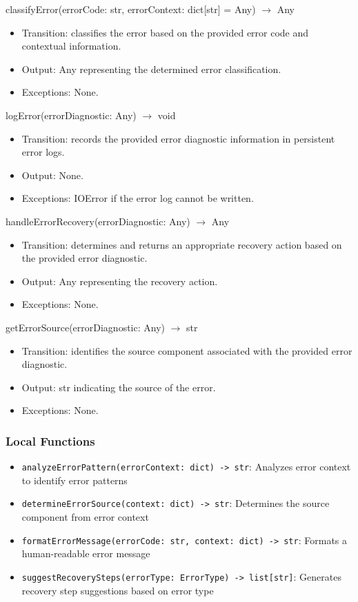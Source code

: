 \documentclass[12pt, titlepage]{article}
\begin{document}
classifyError(errorCode: str, errorContext: dict[str] = Any) $\rightarrow$ Any
\begin{itemize}
  \item Transition: classifies the error based on the provided error code and contextual information.
  \item Output: Any representing the determined error classification.
  \item Exceptions: None.
\end{itemize}

logError(errorDiagnostic: Any) $\rightarrow$ void
\begin{itemize}
  \item Transition: records the provided error diagnostic information in persistent error logs.
  \item Output: None.
  \item Exceptions: IOError if the error log cannot be written.
\end{itemize}

handleErrorRecovery(errorDiagnostic: Any) $\rightarrow$ Any
\begin{itemize}
  \item Transition: determines and returns an appropriate recovery action based on the provided error diagnostic.
  \item Output: Any representing the recovery action.
  \item Exceptions: None.
\end{itemize}

getErrorSource(errorDiagnostic: Any) $\rightarrow$ str
\begin{itemize}
  \item Transition: identifies the source component associated with the provided error diagnostic.
  \item Output: str indicating the source of the error.
  \item Exceptions: None.
\end{itemize}


\subsubsection{Local Functions}

\begin{itemize}
\item \texttt{analyzeErrorPattern(errorContext: dict) -> str}: Analyzes error context to identify error patterns
\item \texttt{determineErrorSource(context: dict) -> str}: Determines the source component from error context
\item \texttt{formatErrorMessage(errorCode: str, context: dict) -> str}: Formats a human-readable error message
\item \texttt{suggestRecoverySteps(errorType: ErrorType) -> list[str]}: Generates recovery step suggestions based on error type
\end{itemize}
\end{document}
